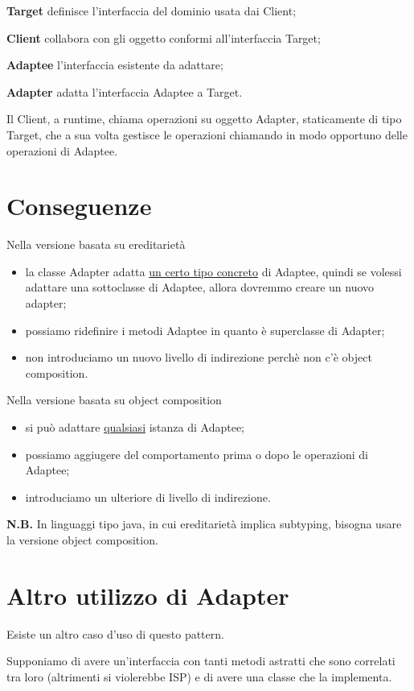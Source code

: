 \textbf{Target} definisce l'interfaccia del dominio usata dai Client;

\textbf{Client} collabora con gli oggetto conformi all'interfaccia Target;

\textbf{Adaptee} l'interfaccia esistente da adattare;

\textbf{Adapter} adatta l'interfaccia Adaptee a Target.

\medskip
Il Client, a runtime, chiama operazioni su oggetto Adapter, staticamente di tipo Target, che a sua volta gestisce le operazioni chiamando in modo opportuno delle operazioni 
di Adaptee.

\section{Conseguenze}

Nella versione basata su ereditarietà
\begin{itemize}
    \item la classe Adapter adatta \underline{un certo tipo concreto} di Adaptee, quindi se volessi adattare una sottoclasse di Adaptee, allora dovremmo creare un 
    nuovo adapter;
    \item possiamo ridefinire i metodi Adaptee in quanto è superclasse di Adapter;
    \item non introduciamo un nuovo livello di indirezione perchè non c'è object composition.
\end{itemize}

Nella versione basata su object composition
\begin{itemize} 
    \item si può adattare \underline{qualsiasi} istanza di Adaptee;
    \item possiamo aggiugere del comportamento prima o dopo le operazioni di Adaptee;
    \item introduciamo un ulteriore di livello di indirezione.
\end{itemize}

\textbf{N.B.} In linguaggi tipo java, in cui ereditarietà implica subtyping, bisogna usare la versione object composition.

\section{Altro utilizzo di Adapter}

Esiste un altro caso d'uso di questo pattern.

Supponiamo di avere un'interfaccia con tanti metodi astratti che sono correlati tra loro (altrimenti si violerebbe ISP) e di avere una classe che la implementa.

